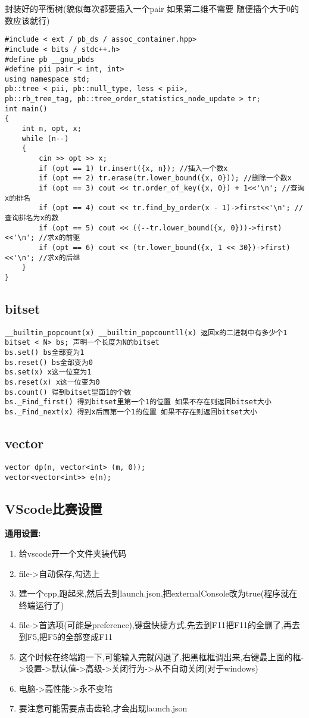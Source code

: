 \documentclass[a4paper,fontset=none]{ctexart}
\begin{document}
封装好的平衡树(貌似每次都要插入一个pair 如果第二维不需要 随便插个大于0的数应该就行)

\begin{verbatim}
#include < ext / pb_ds / assoc_container.hpp>
#include < bits / stdc++.h>
#define pb __gnu_pbds
#define pii pair < int, int>
using namespace std;
pb::tree < pii, pb::null_type, less < pii>,
pb::rb_tree_tag, pb::tree_order_statistics_node_update > tr;
int main()
{
    int n, opt, x;
    while (n--)
    {
        cin >> opt >> x;
        if (opt == 1) tr.insert({x, n}); //插入一个数x
        if (opt == 2) tr.erase(tr.lower_bound({x, 0})); //删除一个数x
        if (opt == 3) cout << tr.order_of_key({x, 0}) + 1<<'\n'; //查询x的排名
        if (opt == 4) cout << tr.find_by_order(x - 1)->first<<'\n'; //查询排名为x的数
        if (opt == 5) cout << ((--tr.lower_bound({x, 0}))->first)<<'\n'; //求x的前驱
        if (opt == 6) cout << (tr.lower_bound({x, 1 << 30})->first)<<'\n'; //求x的后继
    }
}
\end{verbatim}
\subsection{bitset}

\begin{verbatim}
__builtin_popcount(x) __builtin_popcountll(x) 返回x的二进制中有多少个1
bitset < N> bs; 声明一个长度为N的bitset
bs.set() bs全部变为1
bs.reset() bs全部变为0
bs.set(x) x这一位变为1
bs.reset(x) x这一位变为0
bs.count() 得到bitset里面1的个数
bs._Find_first() 得到bitset里第一个1的位置 如果不存在则返回bitset大小
bs._Find_next(x) 得到x后面第一个1的位置 如果不存在则返回bitset大小
\end{verbatim}
\subsection{vector}

\begin{verbatim}
vector dp(n, vector<int> (m, 0));
vector<vector<int>> e(n);
\end{verbatim}
\subsection{VScode比赛设置}

\textbf{通用设置:}
\begin{enumerate}
\item 给vscode开一个文件夹装代码
\item file->自动保存,勾选上
\item 建一个cpp,跑起来,然后去到launch.json,把externalConsole改为true(程序就在终端运行了)
\item file->首选项(可能是preference),键盘快捷方式,先去到F11把F11的全删了,再去到F5,把F5的全部变成F11
\item 这个时候在终端跑一下,可能输入完就闪退了,把黑框框调出来,右键最上面的框->设置->默认值->高级->关闭行为->从不自动关闭(对于windows)
\item 电脑->高性能->永不变暗
\item 要注意可能需要点击齿轮,才会出现launch.json
\end{enumerate}
\end{document}

